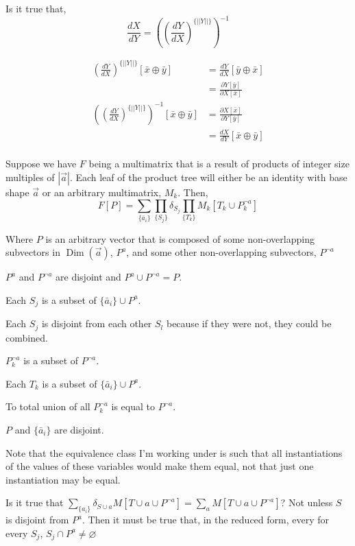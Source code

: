 \documentclass[12pt]{book}
\theoremstyle{plain}
\theoremstyle{definition}
\theoremstyle{ppart}
\theoremstyle{case}
\theoremstyle{solution}
\DeclareMathOperator{\Dim}{Dim}
\newcommand{\shape}[1]{\left|#1\right|}
\newcommand{\transpose}[2]{{#1}^{\{#2\}}}
\let\emptyset\varnothing
\begin{document}
\begin{appendices}
\begin{landscape}
\pagebreak

Is it true that,
\[ \frac{dX}{dY} = \left(\transpose{\left(\frac{dY}{dX}\right)}{\shape{\shape{Y}}}\right)^{-1} \]

\begin{align*}
  \transpose{\left(\frac{dY}{dX}\right)}{\shape{\shape{Y}}} [\bar{x} \oplus \bar{y}]
  &=
  \frac{dY}{dX}[\bar{y} \oplus \bar{x}] \\
  &=
  \frac{\partial Y[\bar{y}]}{\partial X[\bar{x}]} \\
  \left(\transpose{\left(\frac{dY}{dX}\right)}{\shape{\shape{Y}}}\right)^{-1} [\bar{x} \oplus \bar{y}]
  &=
  \frac{\partial X[\bar{x}]}{\partial Y[\bar{y}]} \\
  &=
  \frac{dX}{dY}[\bar{x} \oplus \bar{y}] \\
\end{align*}

\pagebreak

Suppose we have $F$ being a multimatrix that is a result of products of integer size multiples of $\shape{\vec{a}}$.
Each leaf of the product tree will either be an identity with base shape $\vec{a}$ or an arbitrary multimatrix, $M_k$. 
Then,
\[ F[P] = \sum_{\{ \bar{a}_i \}} \prod_{\{ S_j\}} \delta_{S_j} \prod_{\{T_k\}} M_k[ T_k \cup P^{\lnot a}_k ] \]

Where $P$ is an arbitrary vector that is composed of some non-overlapping subvectors in $\Dim(\vec{a})$, $P^a$, and some other non-overlapping subvectors, $P^{\lnot a}$

$P^a$ and $P^{\lnot a}$ are disjoint and $P^a \cup P^{\lnot a} = P$.

Each $S_j$ is a subset of $\{\bar{a}_i\} \cup P^a$.

Each $S_j$ is disjoint from each other $S_l$ because if they were not, they could be combined.

$P^{\lnot a}_k$ is a subset of $P^{\lnot a}$.

Each $T_k$ is a subset of $\{\bar{a}_i\} \cup P^a$.

To total union of all $P^{\lnot a}_k$ is equal to $P^{\lnot a}$.

$P$ and $\{ \bar{a}_i \}$ are disjoint.

Note that the equivalence class I'm working under is such that all instantiations of the values of these variables would make them equal,
not that just one instantiation may be equal.

Is it true that $\sum_{\{a_i\}} \delta_{S \cup a}  M[T \cup a \cup P^{\lnot a}] = \sum_{a} M[T \cup a \cup P^{\lnot a}]$? Not unless $S$ is disjoint from $P^a$. 
Then it must be true that, in the reduced form, every for every $S_j$, $S_j \cap P^a \ne \emptyset$


\end{landscape}
\end{appendices}
\end{document}
